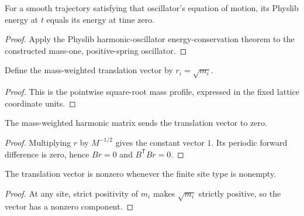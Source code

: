 \begin{theorem}
\label{thm:harmonic:positive-mode-energy-conserved}
For a smooth trajectory satisfying that oscillator's equation of motion, its
Physlib energy at $t$ equals its energy at time zero.
\end{theorem}
\begin{proof}

\leanok
Apply the Physlib harmonic-oscillator energy-conservation theorem to the
constructed mass-one, positive-spring oscillator.
\end{proof}

\begin{definition}
\label{def:harmonic:translation-mode}
Define the mass-weighted translation vector by $r_i=\sqrt{m_i}$.
\end{definition}
\begin{proof}

\leanok
This is the pointwise square-root mass profile, expressed in the fixed lattice
coordinate units.
\end{proof}

\begin{theorem}
\label{thm:harmonic:translation-mode-is-zero}
The mass-weighted harmonic matrix sends the translation vector to zero.
\end{theorem}
\begin{proof}

\leanok
Multiplying $r$ by $M^{-1/2}$ gives the constant vector $1$.  Its periodic
forward difference is zero, hence $Br=0$ and $B^{\mathsf T}Br=0$.
\end{proof}

\begin{theorem}
\label{thm:harmonic:translation-mode-ne-zero}
The translation vector is nonzero whenever the finite site type is nonempty.
\end{theorem}
\begin{proof}

\leanok
At any site, strict positivity of $m_i$ makes $\sqrt{m_i}$ strictly positive,
so the vector has a nonzero component.
\end{proof}

